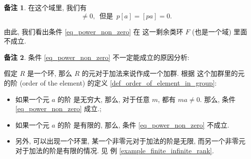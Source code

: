 \documentclass[utf8]{ctexbook}
\theoremstyle{definition}
\newtheorem{memo}{备注}[section]
\begin{document}
\begin{memo}
在这个域里, 我们有
\begin{equation}
[a] \neq 0, \, \mbox{ 但是 } \, p [a] = [pa] = 0 .
\end{equation}

由此, 我们看出条件 \ref{eq_power_non_zero} 在 这一剩余类环 $F$ (也是一个域) 里面不成立.

\end{memo}

\begin{memo}
条件 \ref{eq_power_non_zero} 不一定能成立的原因分析:

假定 $R$ 是一个环, 那么 $R$ 的元对于加法来说作成一个加群. 根据 这个加群里的元的阶 (order of the element) 的定义 \ref{def_order_of_element_in_group}:
\begin{itemize}
\item{如果一个元 $a$ 的阶 是无穷大, 那么, 对于任意 $m$, 都有 $m a \neq 0$. 那么, 条件 \ref{eq_power_non_zero} 成立.;}
\item{如果一个元 $a$ 的阶 是有限的, 那么, 条件 \ref{eq_power_non_zero} 不成立.}
\item{另外, 可以出现一个环里, 某一个非零元对于加法的阶是无限, 而另一个非零元对于加法的阶是有限的情况. 见 例 \ref{example_finite_infinite_rank}.}
\end{itemize}
\end{memo}
\end{document}
